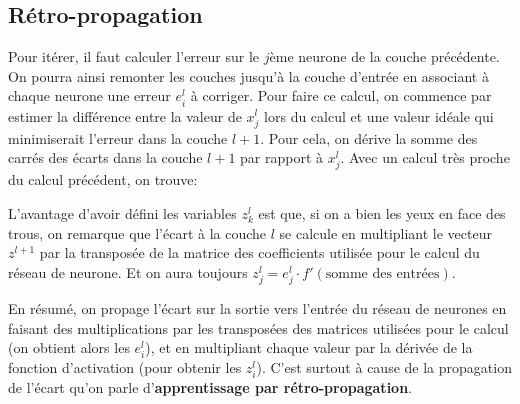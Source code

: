 \documentclass[a4paper]{article}
\def\ffrac#1#2{\frac{\displaystyle #1}{\displaystyle #2}}
\begin{document}
\subsection{Rétro-propagation}
Pour itérer, il faut calculer l'erreur sur le \(j\)ème neurone
  de la couche précédente. On pourra ainsi remonter les couches
  jusqu'à la couche d'entrée en associant à chaque neurone une erreur
  \(e^l_i\) à corriger. Pour faire ce calcul, on commence par estimer
  la différence entre la valeur de \(x_j^l\) lors du calcul et une
  valeur idéale qui minimiserait l'erreur dans la couche \(l+1\). Pour
  cela, on dérive la somme des carrés des écarts dans la couche
  \(l+1\) par rapport à \(x_j^l\). Avec un calcul très proche du
  calcul précédent, on trouve:
\begin{center}
  \fbox{
    \parbox{0.9\textwidth}{
\[
  \begin{array}{rcl}
  e^l_j & = & \Sigma_{k=1}^{n_{l+1}} \ffrac{\partial e^{l+1}_i}{\partial x^l_j}\\
&=& \Sigma_{k=1}^{n_{l+1}} z_k^{l+1} a_{k,j}
  \end{array}
\]
}}
\end{center}
L'avantage d'avoir défini les variables \(z_k^l\) est que, si on a
bien les yeux en face des trous, on remarque que l'écart à la couche
\(l\) se calcule en multipliant le vecteur \(z^{l+1}\) par la
transposée de la matrice des coefficients utilisée pour le calcul du
réseau de neurone. Et on aura toujours \(z^l_j = e^l_j \cdot
f'(\text{somme des entrées})\).

En résumé, on propage l'écart sur la sortie vers l'entrée du réseau de
neurones en faisant des multiplications par les transposées des
matrices utilisées pour le calcul (on obtient alors les \(e^l_i\)), et
en multipliant chaque valeur par la dérivée de la fonction
d'activation (pour obtenir les \(z^l_i\)). C'est surtout à cause de la
propagation de l'écart qu'on parle d'\textbf{apprentissage par
  rétro-propagation}.
\end{document}
